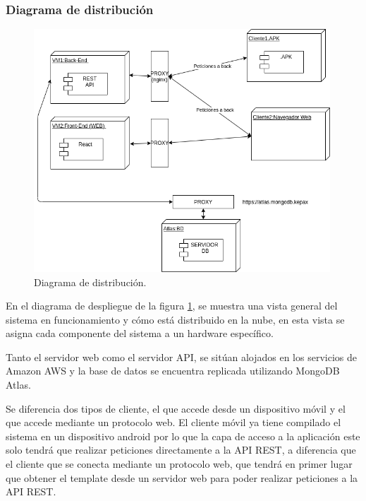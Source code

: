 \documentclass{article}
\begin{document}

\subsubsection*{Diagrama de distribución}

\begin{figure}[H]
    \centering
        \includegraphics[width=0.99\textwidth]{../images/despliegue.png}
    \caption{Diagrama de distribución.}
    \label{despliegue}
\end{figure}

En el diagrama de despliegue de la figura \ref{despliegue}, se muestra una vista general del sistema en funcionamiento y cómo está distribuido en la nube, en esta vista se asigna cada componente del sistema a un hardware específico.

Tanto el servidor web como el servidor API, se sitúan alojados en los servicios de Amazon AWS y la base de datos se encuentra replicada utilizando MongoDB Atlas.

Se diferencia dos tipos de cliente, el que accede desde un dispositivo móvil y el que accede mediante un protocolo web. El cliente móvil ya tiene compilado el sistema en un dispositivo android por lo que la capa de acceso a la aplicación este solo tendrá que realizar peticiones directamente a la API REST, a diferencia que el cliente que se conecta mediante un protocolo web, que tendrá en primer lugar que obtener el template desde un servidor web para poder realizar peticiones a la API REST.
\end{document}
